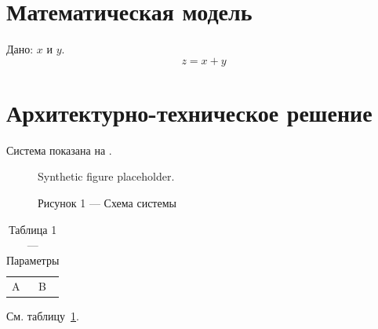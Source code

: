 \documentclass{gostcheck-vkr}
\begin{document}
\section{Математическая модель}
Дано: $x$ и $y$.
\begin{equation}
z = x + y
\end{equation}
\section{Архитектурно-техническое решение}
Система показана на .
\begin{figure}
\centering
Synthetic figure placeholder.
\caption{Рисунок 1 — Схема системы}
\label{fig:demo}
\end{figure}
\begin{table}
\caption{Таблица 1 — Параметры}
\label{tab:demo}
\begin{tabular}{ll}
A & B \\
\end{tabular}
\end{table}
См. таблицу~\ref{tab:demo}.
\end{document}

